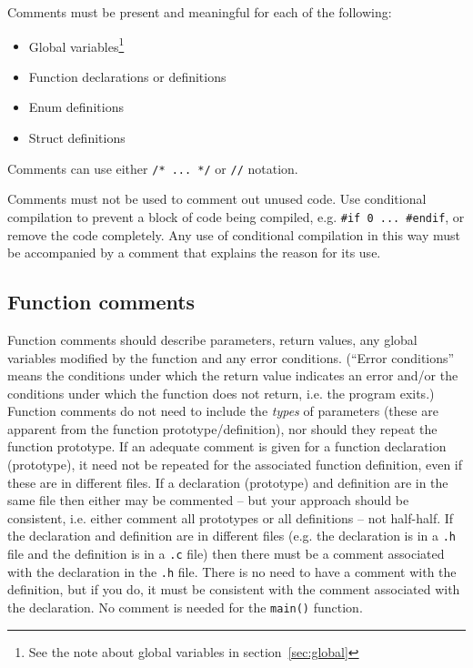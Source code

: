 \documentclass{article}
\newcommand{\icon}[1]{\raisebox{-3pt}{\texttt{[image: icons/\#1.png]}}}
\begin{document}
Comments must be present and meaningful for each of the following:
\begin{itemize}
\itemsep -2pt
    \item Global variables\footnote{See the note about global variables in section~\ref{sec:global}}
    \item Function declarations or definitions
    \item Enum definitions
    \item Struct definitions
\end{itemize}

Comments can use either \texttt{/* ... */} or \texttt{//} notation.

Comments must not be used to comment out unused code. Use conditional compilation to prevent a block of
code being compiled, e.g. \texttt{\#if 0 ... \#endif}, or remove the code completely. Any use of conditional compilation in
this way must be accompanied by a comment that explains the reason for its use.

\subsection{Function comments \protect\hfill\icon{MANUAL-CHECK}}
Function comments should describe parameters, return values, any global variables modified by the function and any error conditions. (``Error conditions'' means
the conditions under which the return value indicates an error and/or the conditions under which the 
function does not return, i.e. the program exits.)
Function comments do not need to include the \textit{types} of parameters (these are apparent from the function prototype/definition), 
nor should they repeat the function prototype. If an adequate comment is given for a function 
declaration (prototype), it need not be repeated for the associated function definition, even if these are in 
different files. If a declaration (prototype) and
definition are in the same file then either may be commented -- but your approach should be consistent, i.e. either comment
all prototypes or all definitions -- not half-half. If the declaration and definition are in different files
(e.g. the declaration is in a \texttt{.h} file and the definition is in a \texttt{.c} file) then there must be a comment
associated with the declaration in the \texttt{.h} file. There is no need to have a comment with the definition, 
but if you do, it must be consistent with the comment associated with the declaration.
No comment is needed for the \texttt{main()} function.
\end{document}
